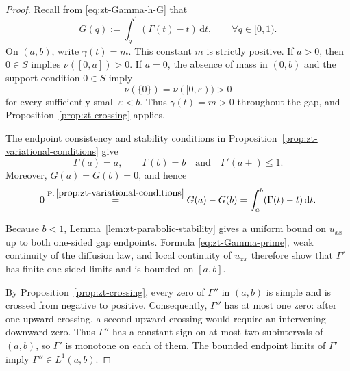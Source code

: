 \documentclass[10pt]{amsart}
\theoremstyle{definition}
\theoremstyle{remark}
\numberwithin{equation}{section}
\newcommand{\1}{\mathbf 1}
\newcommand{\dd}{\,\mathrm d}
\newcommand{\stackref}[2]{\stackrel{#2}{#1}}
\begin{document}
\begin{proof}
Recall from \eqref{eq:zt-Gamma-h-G} that
\begin{equation*}
 G(q):=\int_q^1(\Gamma(t)-t)\dd t,
 \qquad \forall q\in[0,1).
\end{equation*}
On $(a,b)$, write $\gamma(t)=m$. This constant $m$ is strictly positive. If $a>0$, then $0\in S$ implies $\nu([0,a])>0$. If $a=0$, the absence of mass in $(0,b)$ and the support condition $0\in S$ imply
\begin{equation*}
 \nu(\{0\})=\nu([0,\varepsilon))>0
\end{equation*}
for every sufficiently small $\varepsilon<b$.  Thus $\gamma(t)=m>0$ throughout the gap, and Proposition~\ref{prop:zt-crossing} applies.

The endpoint consistency and stability conditions in Proposition~\ref{prop:zt-variational-conditions} give
\begin{equation}
 \Gamma(a)=a,\qquad \Gamma(b)=b
 \quad\text{and}\quad \Gamma'(a+)\leq1.
 \label{eq:zt-Gamma-gap-endpoints}
\end{equation}
Moreover, $G(a)=G(b)=0$, and hence
\begin{equation}
 0\stackref{=}{\mathrm{P.\,\ref{prop:zt-variational-conditions}}}
 G(a)-G(b)
 =\int_a^b(\Gamma(t)-t)\dd t.
 \label{eq:zt-Gamma-gap-centered}
\end{equation}

Because $b<1$, Lemma~\ref{lem:zt-parabolic-stability} gives a uniform bound on $u_{xx}$ up to both one-sided gap endpoints. Formula \eqref{eq:zt-Gamma-prime}, weak continuity of the diffusion law, and local continuity of $u_{xx}$ therefore show that $\Gamma'$ has finite one-sided limits and is bounded on $[a,b]$.

By Proposition~\ref{prop:zt-crossing}, every zero of $\Gamma''$ in $(a,b)$ is simple and is crossed from negative to positive. Consequently, $\Gamma''$ has at most one zero: after one upward crossing, a second upward crossing would require an intervening downward zero. Thus $\Gamma''$ has a constant sign on at most two subintervals of $(a,b)$, so $\Gamma'$ is monotone on each of them. The bounded endpoint limits of $\Gamma'$ imply $\Gamma''\in L^1(a,b)$.


\end{proof}
\end{document}
